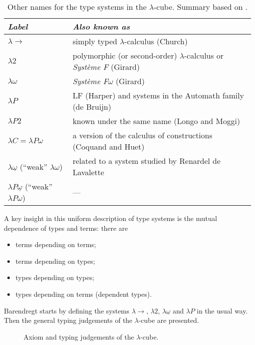\documentclass[12pt,toc=bibliography,numbers=noendperiod,
               footnotes=multiple,twoside]{scrartcl}
\begin{document}
\begin{table}[h]
    \centering
    \begin{tabularx}{\textwidth}{l X}
        \toprule
        \textit{Label} & \textit{Also known as} \\
        \midrule
        \(\lambda\rightarrow\) & simply typed \(\lambda\)-calculus (Church) \\
        \(\lambda2\) & polymorphic (or second-order) \(\lambda\)-calculus or \emph{Système F} (Girard) \\
        \(\lambda\omega\) & \emph{Système F\(\omega\)} (Girard) \\
        \(\lambda P\) & LF (Harper) and systems in the Automath family (de Bruijn) \\
        \(\lambda P2\) & known under the same name (Longo and Moggi) \\
        \(\lambda C = \lambda P\omega\) & a version of the calculus of constructions (Coquand and Huet) \\
        \(\lambda\underline{\omega}\) (\enquote{weak} \(\lambda\omega\)) & related to a system studied by Renardel de Lavalette \\
        \(\lambda P\underline{\omega}\) (\enquote{weak} \(\lambda P\omega\)) & --- \\
        \bottomrule
    \end{tabularx}
    \caption{Other names for the type systems in the \(\lambda\)-cube. Summary based on \textcite[193]{barendregt_lambda_1992}.}
    \label{tab:lambda-cube-type-systems}
\end{table}

A key insight in this uniform description of type systems is the mutual dependence of types and terms: there are

\begin{itemize}
\item terms depending on terms;
\item terms depending on types;
\item types depending on types;
\item types depending on terms (dependent types).
\end{itemize}

Barendregt starts by defining the systems \(\lambda\rightarrow\), \(\lambda2\), \(\lambda\underline{\omega}\) and \(\lambda P\) in the usual way. Then the general typing judgements of the \(\lambda\)-cube are presented.

\begin{figure}
    \begin{prooftree}
    \end{prooftree}
    \begin{prooftree}
    \end{prooftree}
    \caption{Axiom and typing judgements of the \(\lambda\)-cube.}
    \label{fig:lambda-cube-typing}
\end{figure}
\end{document}
